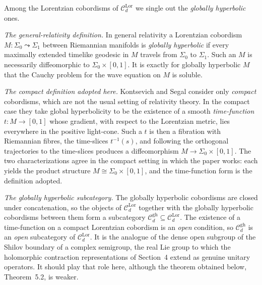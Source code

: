 \begin{definition}
  \label{def:globally-hyperbolic}
  \leanok
  Among the Lorentzian cobordisms of $\mathcal C_d^{\mathrm{Lor}}$ we single out the
  \emph{globally hyperbolic} ones.

  \emph{The general-relativity definition.} In general relativity a Lorentzian
  cobordism $M \colon \Sigma_0 \leadsto \Sigma_1$ between Riemannian manifolds is
  \emph{globally hyperbolic} if every maximally extended timelike geodesic in $M$
  travels from $\Sigma_0$ to $\Sigma_1$. Such an $M$ is necessarily diffeomorphic to
  $\Sigma_0 \times [0,1]$. It is exactly for globally hyperbolic $M$ that the Cauchy
  problem for the wave equation on $M$ is soluble.

  \emph{The compact definition adopted here.} Kontsevich and Segal consider only
  \emph{compact} cobordisms, which are not the usual setting of relativity theory.
  In the compact case they take global hyperbolicity to be the existence of a smooth
  \emph{time-function} $t \colon M \to [0,1]$ whose gradient, with respect to the
  Lorentzian metric, lies everywhere in the positive light-cone. Such a $t$ is then a
  fibration with Riemannian fibres, the time-slices $t^{-1}(s)$, and following the
  orthogonal trajectories to the time-slices produces a diffeomorphism
  $M \to \Sigma_0 \times [0,1]$. The two characterizations agree in the compact
  setting in which the paper works: each yields the product structure
  $M \cong \Sigma_0 \times [0,1]$, and the time-function form is the definition
  adopted.

  \emph{The globally hyperbolic subcategory.} The globally hyperbolic cobordisms are
  closed under concatenation, so the objects of $\mathcal C_d^{\mathrm{Lor}}$ together
  with the globally hyperbolic cobordisms between them form a subcategory
  $\mathcal C_d^{\mathrm{gh}} \subseteq \mathcal C_d^{\mathrm{Lor}}$. The existence of
  a time-function on a compact Lorentzian cobordism is an \emph{open} condition, so
  $\mathcal C_d^{\mathrm{gh}}$ is an \emph{open} subcategory of
  $\mathcal C_d^{\mathrm{Lor}}$. It is the analogue of the dense open subgroup of the
  Shilov boundary of a complex semigroup, the real Lie group to which the holomorphic
  contraction representations of Section~4 extend as genuine unitary operators. It
  should play that role here, although the theorem obtained below, Theorem~5.2, is
  weaker.


\end{definition}
